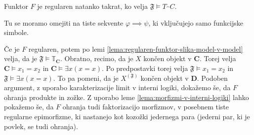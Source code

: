 \documentclass[../kategoricna_logika.tex]{subfiles}
\begin{document}
\begin{lema}
  Funktor $F$ je regularen natanko takrat, ko velja $\mathfrak{F} \models T_\cat{C}$.
\end{lema}
Tu se moramo omejiti na tiste sekvente $\varphi \implies \psi$,
ki vključujejo samo funkcijske simbole.
\begin{dokaz}
  Če je $F$ regularen, potem po lemi \ref{lema:regularen-funktor-slika-model-v-model} velja,
  da je $\mathfrak{F} \models \mathbb{T}_{\mathbf{C}}$.
  Obratno, recimo, da je $X$ končen objekt v $\mathbf{C}$.
  Torej velja $\mathbf{C} \models x_{1} = x_{2}$ in
  $\mathbf{C} \models \exists x (x = x)$. Po predpostavki torej velja
  $\mathfrak{F} \models x_{1} = x_{2}$ in $\mathfrak{F} \models \exists x (x = x)$.
  To pa pomeni, da je $X^{(\mathfrak{F})}$ končen objekt v $\mathbf{D}$.
  Podoben argument, z uporabo karakterizacije limit v interni logiki, dokažemo še,
  da $F$ ohranja produkte in zožke.
  Z uporabo leme \ref{lema:morfizmi-v-interni-logiki} lahko pokažemo še,
  da $F$ ohranja tudi faktorizacijo morfizmov, v posebnem tiste regularne epimorfizme,
  ki nastanejo kot kozožki jedernega para (jederni par, ki je povlek, se tudi ohranja).
\end{dokaz}
%
\end{document}

